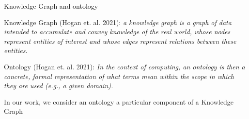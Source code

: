 \begin{frame}{Knowledge Graph and ontology}

    Knowledge Graph (Hogan et. al. 2021):
    \emph{a knowledge graph is a graph of data intended to accumulate and convey knowledge of the real world, whose nodes represent entities of interest and whose edges represent relations between these entities.}

    Ontology (Hogan et. al. 2021):
    \emph{In the context of computing, an ontology is then a concrete, formal representation of what terms mean within the scope in which they are used (e.g., a given domain).}

    \begin{center}
        In our work, we consider an ontology a particular component of a Knowledge Graph
    \end{center}
    
\end{frame}